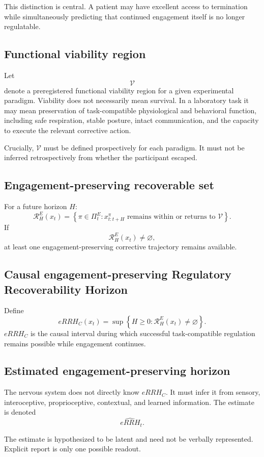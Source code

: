 \documentclass[11pt]{article}
\begin{document}
This distinction is central. A patient may have excellent access to termination while simultaneously predicting that continued engagement itself is no longer regulatable.

\subsection{Functional viability region}
Let
\[
\mathcal V
\]
denote a preregistered functional viability region for a given experimental paradigm. Viability does not necessarily mean survival. In a laboratory task it may mean preservation of task-compatible physiological and behavioral function, including safe respiration, stable posture, intact communication, and the capacity to execute the relevant corrective action.

Crucially, $\mathcal V$ must be defined prospectively for each paradigm. It must not be inferred retrospectively from whether the participant escaped.

\subsection{Engagement-preserving recoverable set}
For a future horizon $H$:
\[
\mathcal R_H^{E}(x_t)=\left\{\pi\in\Pi_t^{E}:x_{t:t+H}^{\pi}\text{ remains within or returns to }\mathcal V\right\}.
\]
If
\[
\mathcal R_H^{E}(x_t)\neq\varnothing,
\]
at least one engagement-preserving corrective trajectory remains available.

\subsection{Causal engagement-preserving Regulatory Recoverability Horizon}
Define
\[
eRRH_C(x_t)=\sup\left\{H\ge0:\mathcal R_H^{E}(x_t)\neq\varnothing\right\}.
\]
$eRRH_C$ is the causal interval during which successful task-compatible regulation remains possible while engagement continues.

\subsection{Estimated engagement-preserving horizon}
The nervous system does not directly know $eRRH_C$. It must infer it from sensory, interoceptive, proprioceptive, contextual, and learned information. The estimate is denoted
\[
\widehat{eRRH}_t.
\]

The estimate is hypothesized to be latent and need not be verbally represented. Explicit report is only one possible readout.
\end{document}
